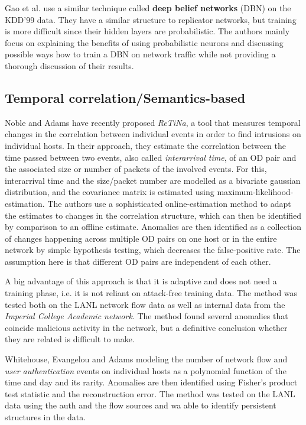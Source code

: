\documentclass[a4paper,12pt,twoside]{report}
\begin{document}
Gao et al. \cite{gao_intrusion_2014} use a similar technique called \textbf{deep belief networks} (DBN) on the KDD'99 data. They have a similar structure to replicator networks, but training is more difficult since their hidden layers are probabilistic. The authors mainly focus on explaining the benefits of using probabilistic neurons and discussing possible ways how to train a DBN on network traffic while not providing a thorough discussion of their results.






\subsection{Temporal correlation/Semantics-based}


Noble and Adams \cite{noble_real-time_2018, noble_correlation-based_2016} have recently proposed \textit{ReTiNa}, a tool that measures temporal changes in the correlation between individual events in order to find intrusions on individual hosts. In their approach, they estimate the correlation between the time passed between two events, also called \textit{interarrival time}, of an OD pair and the associated size or number of packets of the involved events. For this, interarrival time and the size/packet number are modelled as a bivariate gaussian distribution, and the covariance matrix is estimated using maximum-likelihood-estimation. The authors use a sophisticated online-estimation method to adapt the estimates to changes in the correlation structure, which can then be identified by comparison to an offline estimate. Anomalies are then identified as a collection of changes happening across multiple OD pairs on one host or in the entire network by simple hypothesis testing, which decreases the false-positive rate. The assumption here is that different OD pairs are independent of each other.


A big advantage of this approach is that it is adaptive and does not need a training phase, i.e. it is not reliant on attack-free training data. The method was tested both on the LANL network flow data as well as internal data from the \textit{Imperial College Academic network}. The method found several anomalies that coincide malicious activity in the network, but a definitive conclusion whether they are related is difficult to make.

Whitehouse, Evangelou and Adams \cite{whitehouse_activity-based_2016} modeling the number of 
network flow and \textit{user authentication} events on individual hosts as a polynomial function of the time and day and its rarity. Anomalies are then identified using Fisher's product test statistic and the reconstruction error. The method was tested on the LANL data using the auth and the flow sources and wa able to identify persistent structures in the data. 
\end{document}

